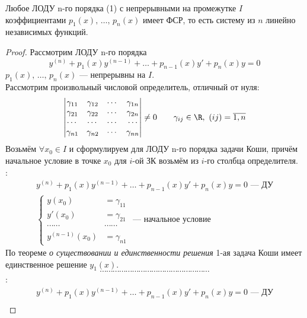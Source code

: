 \begin{theorem*}
    Любое ЛОДУ n-го порядка (1) с непрерывными на промежутке $I$ коэффициентами $p_1(x),\, \ldots,\, p_n(x)$ имеет ФСР, то есть систему из $n$ линейно независимых функций.
\end{theorem*}
\begin{proof}
    Рассмотрим ЛОДУ n-го порядка
    \[
        y^{(n)} + p_1(x)y^{(n-1)} + \ldots + p_{n-1}(x) y' + p_n(x) y = 0
    \]
    $p_1(x),\, \ldots,\, p_n(x)$ --- непрерывны на $I$. \\
    Рассмотрим произвольный числовой определитель, отличный от нуля:
    \[
        \begin{vmatrix}
            \gamma_{11} & \gamma_{12} & \cdots & \gamma_{1n} \\
            \gamma_{21} & \gamma_{22} & \cdots & \gamma_{2n} \\
            \cdots & \cdots & \cdots & \cdots \\
            \gamma_{n1} & \gamma_{n2} & \cdots & \gamma_{nn}
        \end{vmatrix} \ne 0\qquad \gamma_{ij} \in \R,\ (ij) = \overline{1,n}
    \]
    Возьмём $\forall x_0 \in I$ и сформулируем для ЛОДУ n-го порядка задачи Коши, причём начальное условие в точке $x_0$ для $i$-ой ЗК возьмём из $i$-го столбца определителя.\\[1ex]
    : \vspace{-\topsep}
    \begin{gather*}
        y^{(n)} + p_1(x)y^{(n-1)} + \ldots + p_{n-1}(x) y' + p_n(x) y = 0\text{ --- ДУ}\\
        \left\{ \begin{aligned}
            y(x_0) &= \gamma_{11} \\
            y'(x_0) &= \gamma_{21}\\
            \cdots\cdots&\cdots\cdots \\
            y^{(n-1)}(x_0) &= \gamma_{n1} 
        \end{aligned}\right.\text{ --- начальное условие}
    \end{gather*}
    По теореме \textit{о существовании и единственности решения} 1-ая задача Коши имеет единственное решение $y_1(x)$. \\
    \[
        \cdots\cdots\cdots\cdots\cdots\cdots\cdots\cdots\cdots\cdots\cdots\cdots\cdots\cdots\cdots\cdots\cdots
    \]
    :
    \begin{gather*}
        y^{(n)} + p_1(x)y^{(n-1)} + \ldots + p_{n-1}(x) y' + p_n(x) y = 0\text{ --- ДУ}\\

\end{gather*}
\end{proof}
